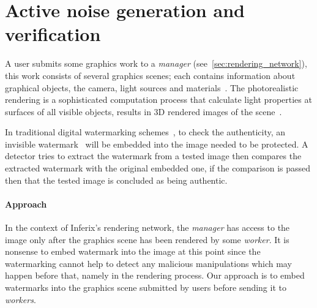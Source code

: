 
\section[Active noise generation and verification]{Active noise generation and verification}
A user submits some graphics work to a \emph{manager} (see~\autoref{sec:rendering_network}), this work consists of several graphics scenes; each contains information about graphical objects, the camera, light sources and materials~\cite{Blender}. The photorealistic rendering is a sophisticated computation process that calculate light properties at surfaces of all visible objects, results in 3D rendered images of the scene~\cite{Hughes2014}.

In traditional digital watermarking schemes~\cite{Cox1997,Cox1999}, to check the authenticity, an invisible watermark~\cite{Yeung1997,Craver1997,Wu1998} will be embedded into the image needed to be protected. A detector tries to extract the watermark from a tested image then compares the extracted watermark with the original embedded one, if the comparison is passed then that the tested image is concluded as being authentic.

\paragraph[Approach]{Approach}\label{par:inferix_approach}
In the context of Inferix's rendering network, the \emph{manager} has access to the image only after the graphics scene has been rendered by some \emph{worker}. It is nonsense to embed watermark into the image at this point since the watermarking cannot help to detect any malicious manipulations which may happen before that, namely in the rendering process. Our approach is to embed watermarks into the graphics scene submitted by users before sending it to \emph{workers}.


